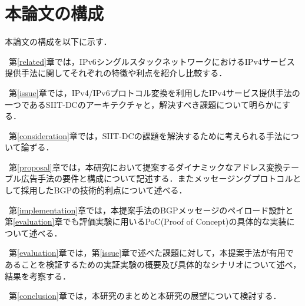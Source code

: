\section{本論文の構成}

本論文の構成を以下に示す．

~第\ref{related}章では，IPv6シングルスタックネットワークにおけるIPv4サービス提供手法に関してそれぞれの特徴や利点を紹介し比較する．

~第\ref{issue}章では，IPv4/IPv6プロトコル変換を利用したIPv4サービス提供手法の一つであるSIIT-DCのアーキテクチャと，解決すべき課題について明らかにする．

~第\ref{consideration}章では，SIIT-DCの課題を解決するために考えられる手法について論ずる．

~第\ref{proposal}章では，本研究において提案するダイナミックなアドレス変換テーブル広告手法の要件と構成について記述する．またメッセージングプロトコルとして採用したBGPの技術的利点について述べる．

~第\ref{implementation}章では，本提案手法のBGPメッセージのペイロード設計と第\ref{evaluation}章でも評価実験に用いるPoC(Proof of Concept)の具体的な実装について述べる．

~第\ref{evaluation}章では，第\ref{issue}章で述べた課題に対して，本提案手法が有用であることを検証するための実証実験の概要及び具体的なシナリオについて述べ，結果を考察する．

~第\ref{conclusion}章では，本研究のまとめと本研究の展望について検討する．

